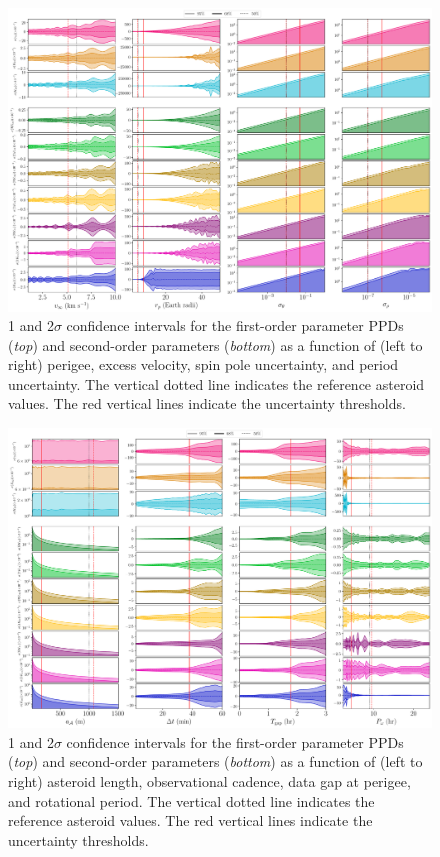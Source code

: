 \documentclass[fleqn,usenatbib]{mnras}
\begin{document}
\begin{figure}
  \centering
  \includegraphics[angle=90, origin=c, width=\linewidth]{figs/scan-all1.pdf}
  \caption{1 and 2$\sigma$ confidence intervals for the first-order parameter PPDs (\textit{top}) and second-order parameters (\textit{bottom}) as a function of (left to right) perigee, excess velocity, spin pole uncertainty, and period uncertainty. The vertical dotted line indicates the reference asteroid values. The red vertical lines indicate the uncertainty thresholds.}
  \label{fig:scan-perigee}
  \label{fig:scan-vex}
  \label{fig:scan-am}
  \label{fig:scan-period}
  \label{fig:scan-physical}
\end{figure}

\begin{figure}
  \centering
  \includegraphics[angle=90, origin=c, width=\linewidth]{figs/scan-all2.pdf}
  \caption{1 and 2$\sigma$ confidence intervals for the first-order parameter PPDs (\textit{top}) and second-order parameters (\textit{bottom}) as a function of (left to right) asteroid length, observational cadence, data gap at perigee, and rotational period. The vertical dotted line indicates the reference asteroid values. The red vertical lines indicate the uncertainty thresholds.}
    \label{fig:scan-rho}
    \label{fig:scan-theta}
    \label{fig:scan-cadence}
    \label{fig:observation-gap}
    \label{fig:scan-observational}
\end{figure}
\end{document}
